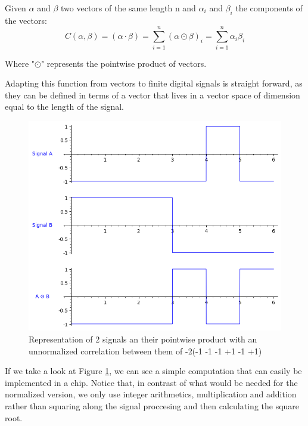\begin{definition}\label{def:2}
  Given $\alpha$ and $\beta$ two vectors of the same length n and $\alpha_{i}$
  and $\beta_{i}$ the components of the vectors:
  \begin{equation}\label{eq:2}
    C(\alpha , \beta) = (\alpha \cdot  \beta) = \sum_{i=1}^n(\alpha \odot \beta)_{i}= \sum_{i=1}^{n} \alpha_{i}\beta_{i}
  \end{equation}

  Where "$\odot$" represents the pointwise product of vectors.

\end{definition}

Adapting this function from vectors to finite digital signals is straight
forward, as they can be defined in terms of a vector that lives in a vector
space of dimension equal to the length of the signal.


\begin{figure}[ht!] %
\begin{center}
\includegraphics[width=0.7\linewidth]{Chapters/Introduction/signals_correlation}
\end{center}
\caption{Representation of 2 signals an their pointwise product with an unnormalized correlation between them of -2(-1 -1 -1 +1 -1 +1)}
\label{introduction_signals_hadamard}
\end{figure}

If we take a look at Figure \ref{introduction_signals_hadamard}, we can see
a simple computation that can easily be implemented in a chip. Notice that,
in contrast of what would be needed for the normalized version, we only use
integer arithmetics, multiplication and addition rather than squaring along the
signal proccesing and then calculating the square root.











